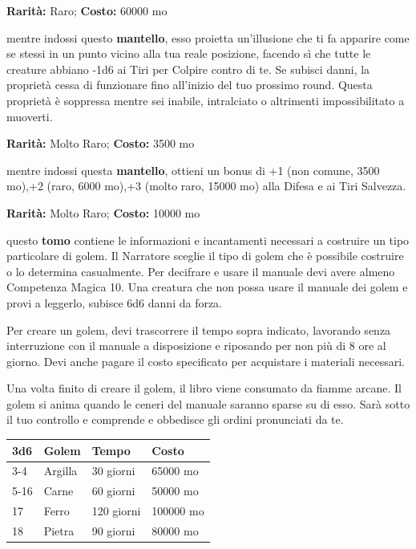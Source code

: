\begin{multicols}{2}

\textbf{Rarità:} Raro; \textbf{Costo:} 60000 mo

mentre indossi questo \textbf{mantello}, esso proietta un'illusione che ti fa apparire come se stessi in un punto vicino alla tua reale posizione, facendo sì che tutte le creature abbiano -1d6 ai Tiri per Colpire contro di te. Se subisci danni, la proprietà cessa di funzionare fino all'inizio del tuo prossimo round. Questa proprietà è soppressa mentre sei inabile, intralciato o altrimenti impossibilitato a muoverti.


\textbf{Rarità:} Molto Raro; \textbf{Costo:} 3500 mo

mentre indossi questa \textbf{mantello}, ottieni un bonus di +1 (non comune, 3500 mo),+2 (raro, 6000 mo),+3 (molto raro, 15000 mo) alla Difesa e ai Tiri Salvezza.


\textbf{Rarità:} Molto Raro; \textbf{Costo:} 10000 mo

questo \textbf{tomo} contiene le informazioni e incantamenti necessari a costruire un tipo particolare di golem. Il Narratore sceglie il tipo di golem che è possibile costruire o lo determina casualmente. Per decifrare e usare il manuale devi avere almeno Competenza Magica 10. Una creatura che non possa usare il manuale dei golem e provi a leggerlo, subisce 6d6 danni da forza.

Per creare un golem, devi trascorrere il tempo sopra indicato, lavorando senza interruzione con il manuale a disposizione e riposando per non più di 8 ore al giorno. Devi anche pagare il costo specificato per acquistare i materiali necessari.

Una volta finito di creare il golem, il libro viene consumato da fiamme arcane. Il golem si anima quando le ceneri del manuale saranno sparse su di esso. Sarà sotto il tuo controllo e comprende e obbedisce gli ordini pronunciati da te.

\medskip

\noindent\begin{tabularx}{\linewidth}{llll}
	\toprule
\rowcolor{gray!20}3d6 &Golem &Tempo &Costo\\
\toprule
3-4 &Argilla &30 giorni &65000 mo\\
\rowcolor{gray!20}5-16 &Carne &60 giorni& 50000 mo\\
17 &Ferro &120 giorni &100000 mo\\
\rowcolor{gray!20}18 &Pietra& 90 giorni &80000 mo
\end{tabularx}


\end{multicols}
